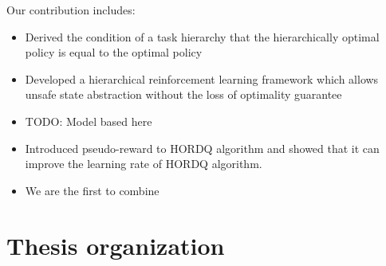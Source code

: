 Our contribution includes: 
\begin{itemize}
\item Derived the condition of a task hierarchy that the hierarchically optimal policy is equal to the optimal policy 
\item Developed a hierarchical reinforcement learning framework which allows unsafe state abstraction without the loss of optimality guarantee
\item TODO: Model based here
\item Introduced pseudo-reward to HORDQ algorithm and showed that it can improve
      the learning rate of HORDQ algorithm. 
\item We are the first to combine 
\end{itemize}

\section{Thesis organization}



